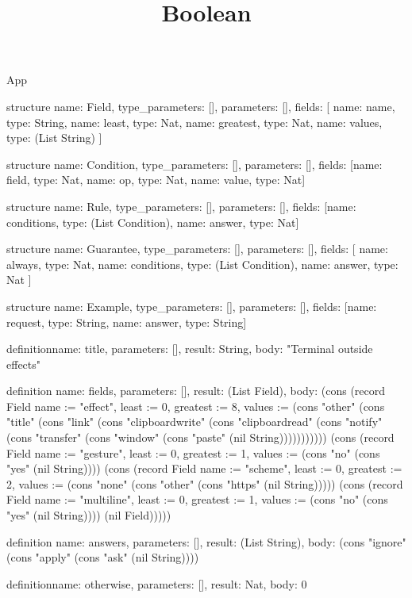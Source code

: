 \begin{lexlean}{App}
\title{Boolean}
\begin{semanticmodule}
structure{
  name: Field,
  type_parameters: [],
  parameters: [],
  fields: [
    {name: name, type: String},
    {name: least, type: Nat},
    {name: greatest, type: Nat},
    {name: values, type: (List String)}
  ]
}

structure{
  name: Condition,
  type_parameters: [],
  parameters: [],
  fields: [{name: field, type: Nat}, {name: op, type: Nat}, {name: value, type: Nat}]
}

structure{
  name: Rule,
  type_parameters: [],
  parameters: [],
  fields: [{name: conditions, type: (List Condition)}, {name: answer, type: Nat}]
}

structure{
  name: Guarantee,
  type_parameters: [],
  parameters: [],
  fields: [
    {name: always, type: Nat},
    {name: conditions, type: (List Condition)},
    {name: answer, type: Nat}
  ]
}

structure{
  name: Example,
  type_parameters: [],
  parameters: [],
  fields: [{name: request, type: String}, {name: answer, type: String}]
}

definition{name: title, parameters: [], result: String, body: "Terminal outside effects"}

definition{
  name: fields,
  parameters: [],
  result: (List Field),
  body: (cons (record Field {name := "effect", least := 0, greatest := 8, values := (cons "other" (cons "title" (cons "link" (cons "clipboardwrite" (cons "clipboardread" (cons "notify" (cons "transfer" (cons "window" (cons "paste" (nil String))))))))))}) (cons (record Field {name := "gesture", least := 0, greatest := 1, values := (cons "no" (cons "yes" (nil String)))}) (cons (record Field {name := "scheme", least := 0, greatest := 2, values := (cons "none" (cons "other" (cons "https" (nil String))))}) (cons (record Field {name := "multiline", least := 0, greatest := 1, values := (cons "no" (cons "yes" (nil String)))}) (nil Field)))))
}

definition{
  name: answers,
  parameters: [],
  result: (List String),
  body: (cons "ignore" (cons "apply" (cons "ask" (nil String))))
}

definition{name: otherwise, parameters: [], result: Nat, body: 0}


\end{semanticmodule}
\end{lexlean}
